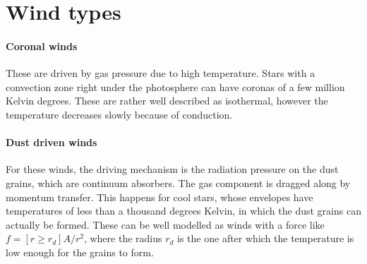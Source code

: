 \documentclass[main.tex]{subfiles}
\begin{document}
\begin{bluebox}


\end{bluebox}



\section{Wind types}

\paragraph{Coronal winds}
These are driven by gas pressure due to high temperature.
Stars with a convection zone right under the photosphere can have coronas of a few million Kelvin degrees. 
These are rather well described as isothermal, however the temperature decreases slowly because of conduction.

\paragraph{Dust driven winds}
For these winds, the driving mechanism is the radiation pressure on the dust grains, which are continuum absorbers. The gas component is dragged along by momentum transfer. 
This happens for cool stars, whose envelopes have temperatures of less than a thousand degrees Kelvin, in which the dust grains can actually be formed. 
These can be well modelled as winds with a force like \(f = [r \geq r_d] A / r^2\), where the radius \(r_d\) is the one after which the temperature is low enough for the grains to form.
\end{document}
